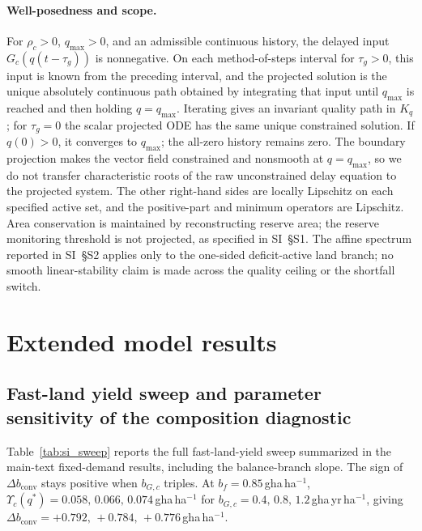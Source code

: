 \documentclass[11pt,a4paper]{article}
\newcommand{\dconv}{\Delta b_{\mathrm{conv}}}
\newcommand{\Ups}{\Upsilon_c}
\begin{document}
\paragraph{Well-posedness and scope.} For $\rho_c>0$, $q_{\max}>0$, and an admissible continuous history, the delayed input $G_c(q(t-\tau_g))$ is nonnegative. On each method-of-steps interval for $\tau_g>0$, this input is known from the preceding interval, and the projected solution is the unique absolutely continuous path obtained by integrating that input until $q_{\max}$ is reached and then holding $q=q_{\max}$. Iterating gives an invariant quality path in $K_q$; for $\tau_g=0$ the scalar projected ODE has the same unique constrained solution. If $q(0)>0$, it converges to $q_{\max}$; the all-zero history remains zero. The boundary projection makes the vector field constrained and nonsmooth at $q=q_{\max}$, so we do not transfer characteristic roots of the raw unconstrained delay equation to the projected system. The other right-hand sides are locally Lipschitz on each specified active set, and the positive-part and minimum operators are Lipschitz. Area conservation is maintained by reconstructing reserve area; the reserve monitoring threshold is not projected, as specified in SI~\S S1. The affine spectrum reported in SI~\S S2 applies only to the one-sided deficit-active land branch; no smooth linear-stability claim is made across the quality ceiling or the shortfall switch.

\section{Extended model results}\label{si:results}

\subsection{Fast-land yield sweep and parameter sensitivity of the composition diagnostic}\label{si:sweep}

Table~\ref{tab:si_sweep} reports the full fast-land-yield sweep summarized in the main-text fixed-demand results, including the balance-branch slope. The sign of $\dconv$ stays positive when $b_{G,c}$ triples. At $b_f=0.85$\,gha\,ha$^{-1}$, $\Ups(q^*)=0.058,\,0.066,\,0.074$\,gha\,ha$^{-1}$ for $b_{G,c}=0.4,\,0.8,\,1.2$\,gha\,yr\,ha$^{-1}$, giving $\dconv=+0.792,\,+0.784,\,+0.776$\,gha\,ha$^{-1}$.
\end{document}
